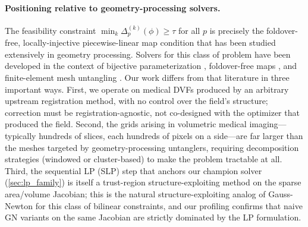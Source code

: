 \paragraph{Positioning relative to geometry-processing solvers.}
The feasibility constraint $\min_k \Delta^{(k)}_p(\phi) \geq \tau$ for all $p$ is precisely the foldover-free, locally-injective piecewise-linear map condition that has been studied extensively in geometry processing. Solvers for this class of problem have been developed in the context of bijective parameterization \cite{schuller2013lim, smith2015bijective, du2020lifting}, foldover-free maps \cite{garanzha2021foldfree}, and finite-element mesh untangling \cite{knupp2001untangling, toulorge2013robust}. Our work differs from that literature in three important ways. First, we operate on medical DVFs produced by an arbitrary upstream registration method, with no control over the field's structure; correction must be registration-agnostic, not co-designed with the optimizer that produced the field. Second, the grids arising in volumetric medical imaging—typically hundreds of slices, each hundreds of pixels on a side—are far larger than the meshes targeted by geometry-processing untanglers, requiring decomposition strategies (windowed or cluster-based) to make the problem tractable at all. Third, the sequential LP (SLP) step that anchors our champion solver (\autoref{sec:lp_family}) is itself a trust-region structure-exploiting method on the sparse area/volume Jacobian; this is the natural structure-exploiting analog of Gauss-Newton for this class of bilinear constraints, and our profiling confirms that naive GN variants on the same Jacobian are strictly dominated by the LP formulation.


